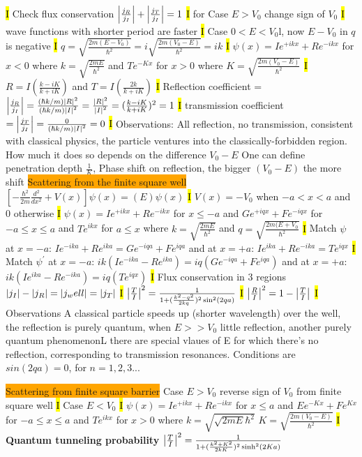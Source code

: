 \documentclass[fontsize=4pt]{scrartcl}
\begin{document}
\hl{I}
Check flux conservation
$\abs{\frac{j_R}{j_I}} + \abs{\frac{j_T}{j_I}} = 1$
\hl{I}
for Case $E>V_0$ change sign of $V_0$ 
\hl{I}
wave functions with shorter period are faster
\hl{I}
Case $0<E<V_0$l, now $E-V_0$ in $q$ is negative
\hl{I}
$q = \sqrt{\frac{2m(E-V_0)}{\hbar^2}} = i\sqrt{\frac{2m(V_0 - E)}{\hbar^2}} = ik$
\hl{I}
$\psi(x) = Ie^{+ikx} + Re^{-ikx}$ for $x < 0$ where $k = \sqrt{\frac{2mE}{\hbar^2}}$ and $Te^{-Kx}$ for $x>0$ where $K=\sqrt{\frac{2m(V_0-E)}{\hbar^2}}$
\hl{I}
$R=I(\frac{k-iK}{k+iK})$ and $T=I(\frac{2k}{k+iK})$
\hl{I}
Reflection coefficient = $\abs{\frac{j_R}{j_I}} = \frac{(\hbar k / m)\abs{R}^2}{(\hbar k  / m)\abs{I}^2} =  \frac{\abs{R}^2}{\abs{I}^2} = (\frac{k-iK}{k+iK})^2 = 1$
\hl{I}
transmission coefficient $= \abs{\frac{j_T}{j_I}} = \frac{0}{(\hbar k  / m)\abs{I}^2} =  0$
\hl{I}
Observations: All reflection, no transmission, consistent with classical physics, the particle ventures into the classically-forbidden region. How much it does so depends on the difference $V_0 - E$ One can define penetration depth $\frac{1}{K}$, Phase shift on reflection, the bigger $(V_0 - E)$ the more shift
\colorbox{Orange}{Scattering from the finite square well}
$[-\frac{\hbar^2}{2m}\frac{d^2}{dx^2} + V(x)]\psi(x) = (E)\psi(x)$
\hl{I}
$V(x) = -V_0$ when $-a<x <a$ and $0$ otherwise 
\hl{I}
$\psi(x) = Ie^{+ikx} + Re^{-ikx}$ for $x \leq -a $  and $Ge^{+iqx} + Fe^{-iqx}$ for $-a \leq x \leq a $ and $Te^{ikx}$ for $a \leq x$ where $k = \sqrt{\frac{2mE}{\hbar^2}}$ and $q = \sqrt{\frac{2m(E+V_0}{\hbar^2}}$
\hl{I}
Match $\psi$ at $x=-a$: $ Ie^{-ika} + Re^{ika} = Ge^{-iqa} + Fe^{iqa}$ and at $x=+a$: $Ie^{ika} + Re^{-ika} = Te^{iqx}$
\hl{I}
Match $\psi^{\prime}$ at $x=-a$: $ ik(Ie^{-ika} - Re^{ika}) = iq(Ge^{-iqa} + Fe^{iqa})$ and at $x=+a$: $ik(Ie^{ika} - Re^{-ika}) = iq(Te^{iqx})$
\hl{I}
Flux conservation in 3 regions
$\abs{j_I} - \abs{j_R} = \abs{j_well} = \abs{j_T}$
\hl{I}
$\abs{\frac{T}{I}}^2 = \frac{1}{1+(\frac{k^2 - q^2}{2kq})^2 \sin^2(2qa)}$
\hl{I}
$\abs{\frac{R}{I}}^2 = 1 - \abs{\frac{T}{I}}$
\hl{I}
Observations
A classical particle speeds up (shorter wavelength) over the well, the reflection is purely quantum, when $E >> V_0$ little reflection, another purely quantum phenomenonL there are special vlaues of E for which there's no reflection, corresponding to transmission resonances. Conditions are $sin(2qa) = 0$, for $n=1,2,3...$

\colorbox{Orange}{Scattering from finite square barrier}
Case $E > V_0$ reverse sign of $V_0$ from finite square well
\hl{I}
Case $E < V_0$
\hl{I}
$\psi(x) = Ie^{+ikx} + Re^{-ikx}$ for $x \leq a $ and $Ee^{-Kx} + Fe^{Kx}$ for $-a \leq x \leq a$  and $Te^{ikx}$ for $x>0$ where $k = \sqrt{\sqrt{2mE}{\hbar^2}}$ $K=\sqrt{\frac{2m(V_0-E)}{\hbar^2}}$
\hl{I}
\textbf{Quantum tunneling probability}
$\abs{\frac{T}{I}}^2 = \frac{1}{1+(\frac{k^2 + K^2}{2kK})^2 \sinh^2(2Ka)}$
\end{document}
